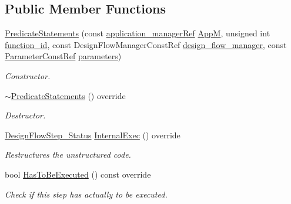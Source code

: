 \subsection*{Public Member Functions}
\begin{DoxyCompactItemize}
\item 
\hyperlink{classPredicateStatements_a2b3d9e0854bdf22630147df2f1e43ef4}{Predicate\+Statements} (const \hyperlink{application__manager_8hpp_a04ccad4e5ee401e8934306672082c180}{application\+\_\+manager\+Ref} \hyperlink{classFrontendFlowStep_a0ac0d8db2a378416583f51c4faa59d15}{AppM}, unsigned int \hyperlink{classFunctionFrontendFlowStep_a58ef2383ad1a212a8d3f396625a4b616}{function\+\_\+id}, const Design\+Flow\+Manager\+Const\+Ref \hyperlink{classDesignFlowStep_ab770677ddf087613add30024e16a5554}{design\+\_\+flow\+\_\+manager}, const \hyperlink{Parameter_8hpp_a37841774a6fcb479b597fdf8955eb4ea}{Parameter\+Const\+Ref} \hyperlink{classDesignFlowStep_a802eaafe8013df706370679d1a436949}{parameters})
\begin{DoxyCompactList}\small\item\em Constructor. \end{DoxyCompactList}\item 
\hyperlink{classPredicateStatements_aa1b3c1e71c8fbc438a8867c1610a6bd6}{$\sim$\+Predicate\+Statements} () override
\begin{DoxyCompactList}\small\item\em Destructor. \end{DoxyCompactList}\item 
\hyperlink{design__flow__step_8hpp_afb1f0d73069c26076b8d31dbc8ebecdf}{Design\+Flow\+Step\+\_\+\+Status} \hyperlink{classPredicateStatements_aa2e79d8893443b3126d0e356aeb7f924}{Internal\+Exec} () override
\begin{DoxyCompactList}\small\item\em Restructures the unstructured code. \end{DoxyCompactList}\item 
bool \hyperlink{classPredicateStatements_a1933a849ecb25e92d3a13d2e6be605b6}{Has\+To\+Be\+Executed} () const override
\begin{DoxyCompactList}\small\item\em Check if this step has actually to be executed. \end{DoxyCompactList}\end{DoxyCompactItemize}
